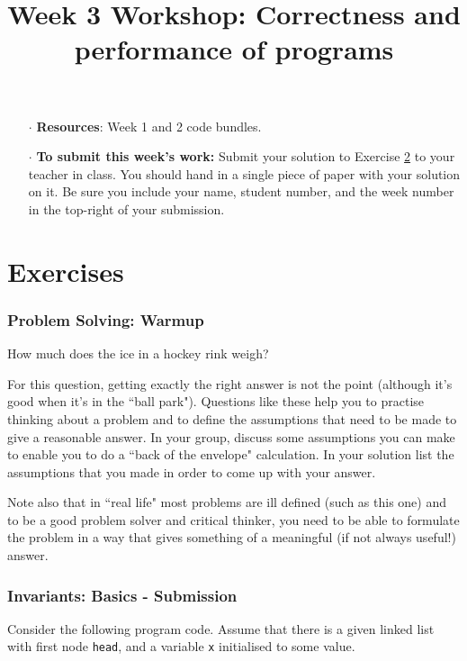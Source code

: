 \documentclass[twoside=false,DIV=14]{scrartcl}
\title{\color{redish} \vspace{-2em}Week 3 Workshop: Correctness and performance of programs}
\begin{document}
{\color{blackish}\maketitle}\vspace{-2em}


\begin{itemize}
\item[$\cdot$] {\bf Resources}: Week 1 and 2 code bundles.
\item[$\cdot$] {\bf To submit this week's work:} Submit your solution to Exercise \ref{sec:submission} to your teacher in class.  You should hand in a single piece of paper with your solution on it.  Be sure you include your name, student number, and the week number in the top-right of your submission.
\end{itemize}


\part*{Exercises}

\section{Problem Solving: Warmup}
  How much does the ice in a hockey rink weigh? 
    
  For this question, getting exactly the right answer is not the point (although it's good when it's in the ``ball park").
  Questions like these help you to practise thinking about a problem and to define the assumptions that need to be
  made to give a reasonable answer. In your group, discuss some assumptions you can make to enable you
  to do a ``back of the envelope" calculation. In your solution list the assumptions that you made in order to
  come up with your answer.
  
  Note also that in ``real life" most problems are ill defined (such as this one) and to be a good problem
  solver and critical thinker, you need to be able to formulate the problem in a way that gives something of
  a meaningful (if not always useful!) answer.
  
\section{Invariants: Basics - Submission}
\label{sec:submission}

Consider the following program code. Assume that there is a given linked list with first node {\tt head}, and a variable {\tt x} initialised to some value.
\end{document}
